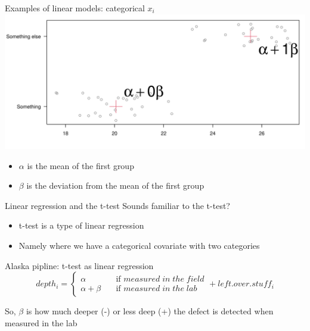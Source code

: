 \documentclass[
  ignorenonframetext,
]{beamer}
\providecommand{\tightlist}{%
  \setlength{\itemsep}{0pt}\setlength{\parskip}{0pt}}
\begin{document}
\begin{frame}{Examples of linear models: categorical \(x_i\)}
\label{examples-of-linear-models-categorical-x_i-2}
\includegraphics{IntroLM_files/figure-beamer/unnamed-chunk-13-1.pdf}

\begin{itemize}
\tightlist
\item
  \(\alpha\) is the mean of the first group
\item
  \(\beta\) is the deviation from the mean of the first group
\end{itemize}
\end{frame}

\begin{frame}{Linear regression and the t-test}
\label{linear-regression-and-the-t-test}
Sounds familiar to the t-test?

\pause

\begin{itemize}
\tightlist
\item
  t-test is a type of linear regression
\item
  Namely where we have a categorical covariate with two categories
\end{itemize}
\end{frame}

\begin{frame}{Alaska pipline: t-test as linear regression}
\label{alaska-pipline-t-test-as-linear-regression}
\[
depth_i =
  \begin{cases}
    \alpha       & \quad \text{if } measured \; in \; the \; field \\
    \alpha + \beta       & \quad \text{if } measured \; in \; the \; lab
  \end{cases}
  + left.over.stuff_i
\]

So, \(\beta\) is how much deeper (-) or less deep (+) the defect is
detected when measured in the lab
\end{frame}
\end{document}
